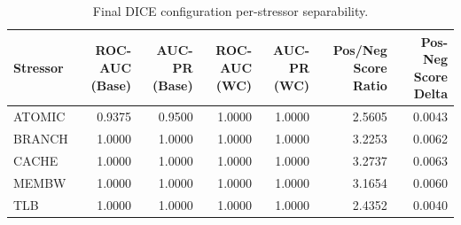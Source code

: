\begin{table}[t]
\centering
\caption{Final DICE configuration per-stressor separability.}
\label{tab:dice_full_stressor}
\footnotesize
\begin{tabular}{lrrrrrr}
\toprule
Stressor & ROC-AUC (Base) & AUC-PR (Base) & ROC-AUC (WC) & AUC-PR (WC) & Pos/Neg Score Ratio & Pos-Neg Score Delta \\
\midrule
ATOMIC & 0.9375 & 0.9500 & 1.0000 & 1.0000 & 2.5605 & 0.0043 \\
BRANCH & 1.0000 & 1.0000 & 1.0000 & 1.0000 & 3.2253 & 0.0062 \\
CACHE & 1.0000 & 1.0000 & 1.0000 & 1.0000 & 3.2737 & 0.0063 \\
MEMBW & 1.0000 & 1.0000 & 1.0000 & 1.0000 & 3.1654 & 0.0060 \\
TLB & 1.0000 & 1.0000 & 1.0000 & 1.0000 & 2.4352 & 0.0040 \\
\bottomrule
\end{tabular}

\end{table}
